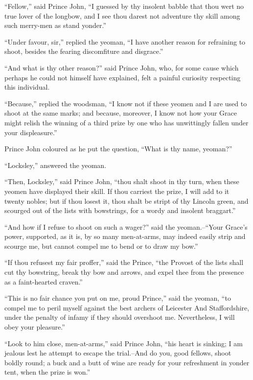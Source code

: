 ``Fellow,'' said Prince John, ``I guessed by thy insolent babble that
thou wert no true lover of the longbow, and I see thou darest not
adventure thy skill among such merry-men as stand yonder.''

``Under favour, sir,'' replied the yeoman, ``I have another reason for
refraining to shoot, besides the fearing discomfiture and disgrace.''

``And what is thy other reason?'' said Prince John, who, for some cause
which perhaps he could not himself have explained, felt a painful
curiosity respecting this individual.

``Because,'' replied the woodsman, ``I know not if these yeomen and I
are used to shoot at the same marks; and because, moreover, I know not
how your Grace might relish the winning of a third prize by one who has
unwittingly fallen under your displeasure.''

Prince John coloured as he put the question, ``What is thy name,
yeoman?''

``Locksley,'' answered the yeoman.

``Then, Locksley,'' said Prince John, ``thou shalt shoot in thy turn,
when these yeomen have displayed their skill. If thou carriest the
prize, I will add to it twenty nobles; but if thou losest it, thou shalt
be stript of thy Lincoln green, and scourged out of the lists with
bowstrings, for a wordy and insolent braggart.''

``And how if I refuse to shoot on such a wager?'' said the
yeoman.--``Your Grace's power, supported, as it is, by so many
men-at-arms, may indeed easily strip and scourge me, but cannot compel
me to bend or to draw my bow.''

``If thou refusest my fair proffer,'' said the Prince, ``the Provost of
the lists shall cut thy bowstring, break thy bow and arrows, and expel
thee from the presence as a faint-hearted craven.''

``This is no fair chance you put on me, proud Prince,'' said the yeoman,
``to compel me to peril myself against the best archers of Leicester And
Staffordshire, under the penalty of infamy if they should overshoot me.
Nevertheless, I will obey your pleasure.''

``Look to him close, men-at-arms,'' said Prince John, ``his heart is
sinking; I am jealous lest he attempt to escape the trial.--And do you,
good fellows, shoot boldly round; a buck and a butt of wine are ready
for your refreshment in yonder tent, when the prize is won.''

